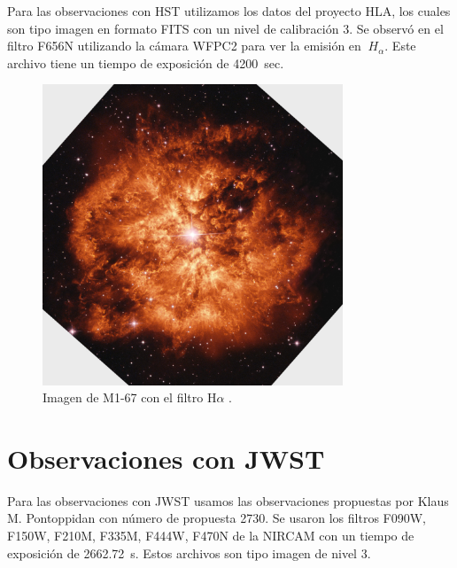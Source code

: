 \documentclass{book}
\begin{document}
Para las observaciones con HST utilizamos los datos del proyecto HLA, los cuales son tipo imagen en formato FITS con un nivel de calibración 3.  Se observó en el filtro F656N utilizando la cámara WFPC2 para ver la emisión en $\SI{}{H_\alpha}$. Este archivo tiene un tiempo de exposición de \SI{4200}{sec}.  

\begin{figure}[h]
    \centering
    \includegraphics[width=0.8\textwidth]{m1-67-comp-full-hst.jpg}
    \caption{Imagen de M1-67 con el filtro H$\alpha$ .}
    \label{fig:M1-67HST}
\end{figure}

\section{Observaciones con JWST}

Para las observaciones con JWST usamos las observaciones propuestas por Klaus M. Pontoppidan con número de propuesta 2730. Se usaron los filtros F090W, F150W, F210M, F335M, F444W, F470N de la NIRCAM con un tiempo de exposición de \SI{2662.72}{s}. Estos archivos son tipo imagen de nivel 3.
\end{document}
